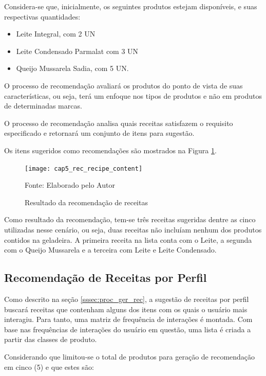 Considera-se que, inicialmente, os seguintes produtos estejam disponíveis, e suas respectivas quantidades:

\begin{itemize} \parskip -3pt
    \item Leite Integral, com 2 UN
    \item Leite Condensado Parmalat com 3 UN 
    \item Queijo Mussarela Sadia, com 5 UN.
\end{itemize}

O processo de recomendação avaliará os produtos do ponto de vista de suas características, ou seja, terá um enfoque nos tipos de produtos e não em produtos de determinadas marcas.

O processo de recomendação analisa quais receitas satisfazem o requisito especificado e retornará um conjunto de itens para sugestão.

Os itens sugeridos como recomendações são mostrados na Figura \ref{fig:cap5_rec_recipe_content}.

\begin{figure}[htb]
\caption{Resultado da recomendação de receitas}
\label{fig:cap5_rec_recipe_content}
\texttt{[image: cap5\_rec\_recipe\_content]}

\footnotesize{Fonte: Elaborado pelo Autor}
\end{figure}

Como resultado da recomendação, tem-se três receitas sugeridas dentre as cinco utilizadas nesse cenário, ou seja, duas receitas não incluíam nenhum dos produtos contidos na geladeira. A primeira receita na lista conta com o Leite, a segunda com o Queijo Mussarela e a terceira com Leite e Leite Condensado.

\subsection{Recomendação de Receitas por Perfil}

Como descrito na seção \ref{sssec:proc_ger_rec}, a sugestão de receitas por perfil buscará receitas que contenham alguns dos itens com os quais o usuário mais interagiu. Para tanto, uma matriz de frequência de interações é montada.  Com base nas frequências de interações do usuário em questão, uma lista é criada a partir das classes de produto.

Considerando que limitou-se o total de produtos para geração de recomendação em cinco (5) e que estes são:

